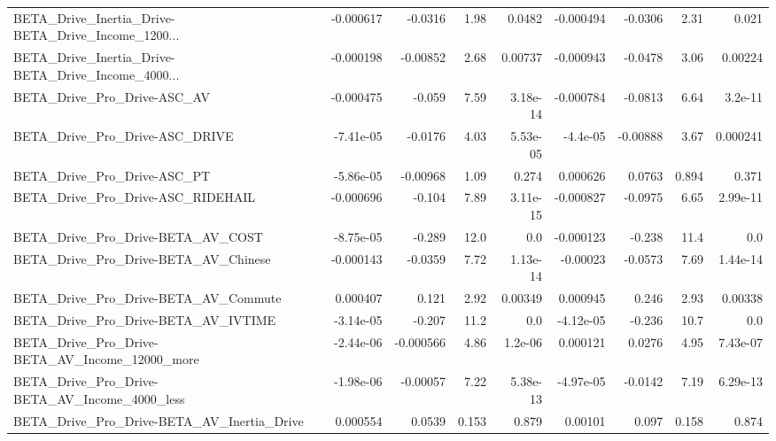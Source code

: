 \begin{tabular}{lrrrrrrrr}
BETA\_Drive\_Inertia\_Drive-BETA\_Drive\_Income\_1200... &   -0.000617 &      -0.0316 &     1.98 &   0.0482 &  -0.000494 &     -0.0306 &         2.31 &         0.021 \\
BETA\_Drive\_Inertia\_Drive-BETA\_Drive\_Income\_4000... &   -0.000198 &     -0.00852 &     2.68 &  0.00737 &  -0.000943 &     -0.0478 &         3.06 &       0.00224 \\
BETA\_Drive\_Pro\_Drive-ASC\_AV                        &   -0.000475 &       -0.059 &     7.59 & 3.18e-14 &  -0.000784 &     -0.0813 &         6.64 &       3.2e-11 \\
BETA\_Drive\_Pro\_Drive-ASC\_DRIVE                     &   -7.41e-05 &      -0.0176 &     4.03 & 5.53e-05 &   -4.4e-05 &    -0.00888 &         3.67 &      0.000241 \\
BETA\_Drive\_Pro\_Drive-ASC\_PT                        &   -5.86e-05 &     -0.00968 &     1.09 &    0.274 &   0.000626 &      0.0763 &        0.894 &         0.371 \\
BETA\_Drive\_Pro\_Drive-ASC\_RIDEHAIL                  &   -0.000696 &       -0.104 &     7.89 & 3.11e-15 &  -0.000827 &     -0.0975 &         6.65 &      2.99e-11 \\
BETA\_Drive\_Pro\_Drive-BETA\_AV\_COST                  &   -8.75e-05 &       -0.289 &     12.0 &      0.0 &  -0.000123 &      -0.238 &         11.4 &           0.0 \\
BETA\_Drive\_Pro\_Drive-BETA\_AV\_Chinese               &   -0.000143 &      -0.0359 &     7.72 & 1.13e-14 &   -0.00023 &     -0.0573 &         7.69 &      1.44e-14 \\
BETA\_Drive\_Pro\_Drive-BETA\_AV\_Commute               &    0.000407 &        0.121 &     2.92 &  0.00349 &   0.000945 &       0.246 &         2.93 &       0.00338 \\
BETA\_Drive\_Pro\_Drive-BETA\_AV\_IVTIME                &   -3.14e-05 &       -0.207 &     11.2 &      0.0 &  -4.12e-05 &      -0.236 &         10.7 &           0.0 \\
BETA\_Drive\_Pro\_Drive-BETA\_AV\_Income\_12000\_more     &   -2.44e-06 &    -0.000566 &     4.86 &  1.2e-06 &   0.000121 &      0.0276 &         4.95 &      7.43e-07 \\
BETA\_Drive\_Pro\_Drive-BETA\_AV\_Income\_4000\_less      &   -1.98e-06 &     -0.00057 &     7.22 & 5.38e-13 &  -4.97e-05 &     -0.0142 &         7.19 &      6.29e-13 \\
BETA\_Drive\_Pro\_Drive-BETA\_AV\_Inertia\_Drive         &    0.000554 &       0.0539 &    0.153 &    0.879 &    0.00101 &       0.097 &        0.158 &         0.874 \\

\end{tabular}
